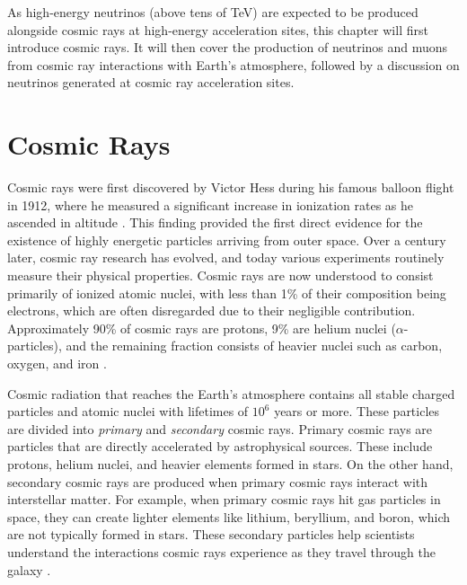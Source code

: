 As high-energy neutrinos (above tens of TeV) are expected to be produced alongside cosmic rays at high-energy acceleration sites, this chapter will first introduce cosmic rays. It will then cover the production of neutrinos and muons from cosmic ray interactions with Earth's atmosphere, followed by a discussion on neutrinos generated at cosmic ray acceleration sites.

\section{Cosmic Rays}
\label{sec:cosmic_rays}
Cosmic rays were first discovered by Victor Hess during his famous balloon flight in 1912, where he measured a significant increase in ionization rates as he ascended in altitude . This finding provided the first direct evidence for the existence of highly energetic particles arriving from outer space. Over a century later, cosmic ray research has evolved, and today various experiments routinely measure their physical properties. Cosmic rays are now understood to consist primarily of ionized atomic nuclei, with less than 1\% of their composition being electrons, which are often disregarded due to their negligible contribution. Approximately 90\% of cosmic rays are protons, 9\% are helium nuclei ($\alpha$-particles), and the remaining fraction consists of heavier nuclei such as carbon, oxygen, and iron .

Cosmic radiation that reaches the Earth's atmosphere contains all stable charged particles and atomic nuclei with lifetimes of $10^6$ years or more. These particles are divided into \emph{primary} and \emph{secondary} cosmic rays. Primary cosmic rays are particles that are directly accelerated by astrophysical sources. These include protons, helium nuclei, and heavier elements formed in stars. On the other hand, secondary cosmic rays are produced when primary cosmic rays interact with interstellar matter. For example, when primary cosmic rays hit gas particles in space, they can create lighter elements like lithium, beryllium, and boron, which are not typically formed in stars. These secondary particles help scientists understand the interactions cosmic rays experience as they travel through the galaxy .


